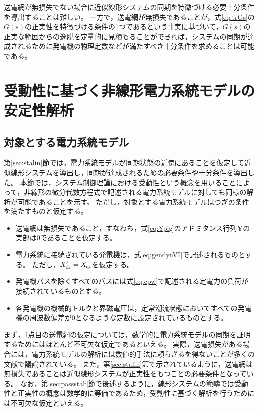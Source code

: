 \documentclass[tombow,dvipdfmx]{corona-a5}
\begin{document}
送電網が無損失でない場合に近似線形システムの同期を特徴づける必要十分条件を導出することは難しい。
一方で，送電網が無損失であることが，式\ref{eq:trGs}の$G(s)$の正実性を特徴づける条件の1つであるという事実に基づいて，$G(s)$の正実な範囲からの逸脱を定量的に見積もることができれば，システムの同期が達成されるために発電機の物理定数などが満たすべき十分条件を求めることは可能である。


\section{受動性に基づく非線形電力系統モデルの安定性解析}

\subsection{対象とする電力系統モデル}\label{sec:objmod}

第\ref{sec:stalin}節では，電力系統モデルが同期状態の近傍にあることを仮定して近似線形システムを導出し，同期が達成されるための必要条件や十分条件を導出した。
本節では，システム制御理論における受動性という概念を用いることによって，非線形の微分代数方程式で記述される電力系統モデルに対しても同様の解析が可能であることを示す。
ただし，対象とする電力系統モデルはつぎの条件を満たすものと仮定する。

\begin{itemize}
\item 送電網は無損失であること，すなわち，式\ref{eq:Ypig}のアドミタンス行列$\bm{Y}$の実部は0であることを仮定する。
\item 電力系統に接続されている発電機は，式\ref{eq:gendynVI}で記述されるものとする。
ただし，$X_{{\rm d}i}'=X_{{\rm q}i}$を仮定する。
\item 発電機バスを除くすべてのバスには式\ref{eq:cpw}で記述される定電力の負荷が接続されているものとする。
\item 各発電機の機械的トルクと界磁電圧は，定常潮流状態においてすべての発電機の周波数偏差が0となるような定数に設定されているものとする。
\end{itemize}
まず，1点目の送電網の仮定については，数学的に電力系統モデルの同期を証明するためにはほとんど不可欠な仮定であるといえる。
実際，送電損失がある場合には，電力系統モデルの解析には数値的手法に頼らざるを得ないことが多くの文献で議論されている\cite{narasimhamurthi1984existence,yang2019distributed}。
また，第\ref{sec:stalin}節で示されているように，送電網は無損失であることは近似線形システムが正実性をもつことの必要条件となっている。
なお，第\ref{sec:passstab}節で後述するように，線形システムの範疇では受動性と正実性の概念は数学的に等価であるため，受動性に基づく解析を行うためには不可欠な仮定といえる。
\end{document}
